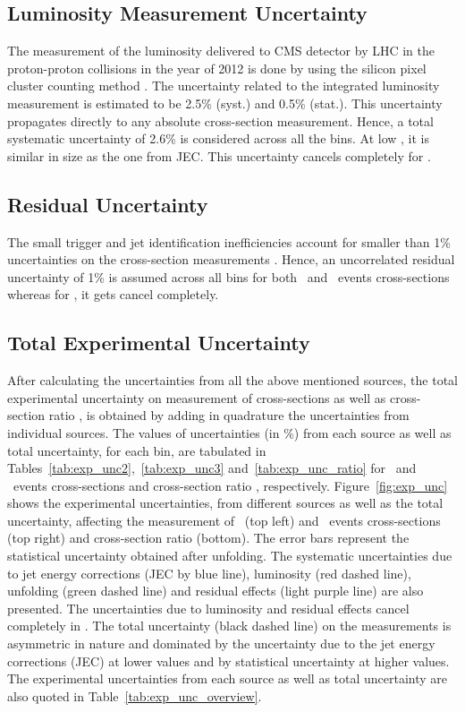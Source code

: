 \subsection{Luminosity Measurement Uncertainty}
The measurement of the luminosity delivered to CMS detector by LHC in the proton-proton collisions in the year of 2012 is done by using the silicon pixel cluster counting method \cite{CMS:2013gfa}. The uncertainty related to the integrated luminosity measurement is estimated to be 2.5\% (syst.) and 0.5\% (stat.). This uncertainty propagates directly to any absolute cross-section measurement. Hence, a total systematic uncertainty of 2.6\% is considered across all the \httwo bins. At low \httwons, it is similar in size as the one from JEC. This uncertainty cancels completely for \ratio.

\subsection{Residual Uncertainty}
The small trigger and jet identification inefficiencies account for smaller than 1\% uncertainties on the cross-section measurements \cite{Chatrchyan:2012bja,Khachatryan:2016mlc}. Hence, an uncorrelated residual uncertainty of 1\% is assumed across all \httwo bins for both \njt~and \njth~events cross-sections whereas for \ratio, it gets cancel completely.

\subsection{Total Experimental Uncertainty}
After calculating the uncertainties from all the above mentioned sources, the total experimental uncertainty on measurement of cross-sections as well as cross-section ratio \ratio, is obtained by adding in quadrature the uncertainties from individual sources. The values of uncertainties (in \%) from each source as well as total uncertainty, for each \httwo bin, are tabulated in Tables~\ref{tab:exp_unc2},~\ref{tab:exp_unc3} and~\ref{tab:exp_unc_ratio} for \njt~and \njth~events cross-sections and cross-section ratio \ratio, respectively. Figure~\ref{fig:exp_unc} shows the experimental uncertainties, from different sources as well as the total uncertainty, affecting the measurement of \njt~(top left) and \njth~events cross-sections (top right) and cross-section ratio \ratio (bottom). The error bars represent the statistical uncertainty obtained after unfolding. The systematic uncertainties due to jet energy corrections (JEC by blue line), luminosity (red dashed line), unfolding (green dashed line) and residual effects (light purple line) are also presented. The uncertainties due to luminosity and residual effects cancel completely in \ratio. The total uncertainty (black dashed line) on the measurements is asymmetric in nature and dominated by the uncertainty due to the jet energy corrections (JEC) at lower \httwo values and by statistical uncertainty at higher \httwo values. The experimental uncertainties from each source as well as total uncertainty are also quoted in Table~\ref{tab:exp_unc_overview}. 

